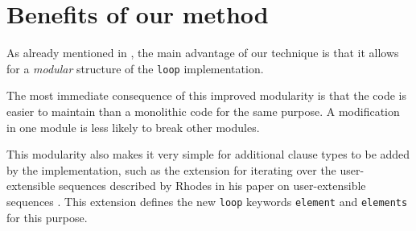 \section{Benefits of our method}
\label{sec-benefits}
 
As already mentioned in ,
the main advantage of our technique is that it allows for a
\emph{modular} structure of the \texttt{loop} implementation.

The most immediate consequence of this improved modularity is that the
code is easier to maintain than a monolithic code for the same
purpose.  A modification in one module is less likely to break other
modules.

This modularity also makes it very simple for additional clause types
to be added by the \commonlisp{} implementation, such as the extension
for iterating over the user-extensible sequences described by Rhodes
in his paper on user-extensible sequences
\cite{Rhodes:2007:USC:1622123.1622138}.  This extension defines the
new \texttt{loop} keywords \texttt{element} and \texttt{elements} for
this purpose.
